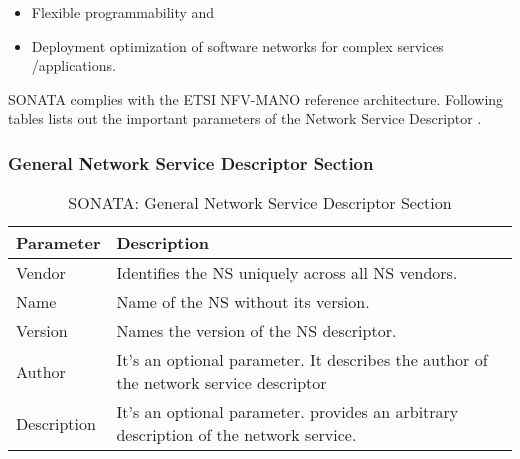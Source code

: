 \begin{itemize}
    \item Flexible programmability and 
    \item Deployment optimization of software networks for complex services /applications.
\end{itemize}

SONATA complies with the ETSI NFV-MANO reference architecture. Following tables lists out the important parameters of the Network Service Descriptor \cite{SONATASchemaDocumentation}.
\subsubsection{General Network Service Descriptor Section}
    \begin{table}[h]
    \centering
    \begin{tabular}{ |p{4cm}|p{10cm}|}
        \hline
        \textbf{Parameter} & \textbf{Description} \\
        \hline
         
         Vendor & Identifies the NS uniquely across all NS vendors. \\
         \hline
         Name & Name of the NS without its version. \\
         \hline
         Version & Names the version of the NS descriptor. \\
         \hline
         Author & It’s an optional parameter. It describes the author of the network service descriptor \\
         \hline
         Description & It’s an optional parameter. provides an arbitrary description of the network service. \\
         \hline
    \end{tabular}
    \caption{SONATA: General Network Service Descriptor Section}
    \label{tab:SONATA_general_section}
\end{table}

